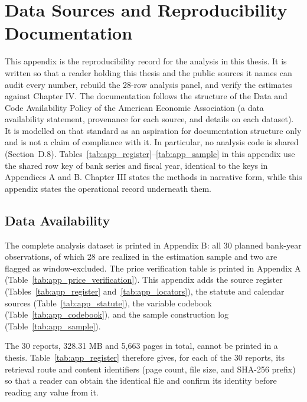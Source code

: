 \chapter{Data Sources and Reproducibility Documentation}
\label{app:reproducibility}

This appendix is the reproducibility record for the analysis in this thesis. It is written so that a reader holding this thesis and the public sources it names can audit every number, rebuild the 28-row analysis panel, and verify the estimates against Chapter IV. The documentation follows the structure of the Data and Code Availability Policy of the American Economic Association \citep{aea2026datacode} (a data availability statement, provenance for each source, and details on each dataset). It is modelled on that standard as an aspiration for documentation structure only and is not a claim of compliance with it. In particular, no analysis code is shared (Section~D.8). Tables~\ref{tab:app_register}--\ref{tab:app_sample} in this appendix use the shared row key of bank series and fiscal year, identical to the keys in Appendices A and B. Chapter III states the methods in narrative form, while this appendix states the operational record underneath them.

\section{Data Availability}

The complete analysis dataset is printed in Appendix B: all 30 planned bank-year observations, of which 28 are realized in the estimation sample and two are flagged as window-excluded. The price verification table is printed in Appendix A (Table~\ref{tab:app_price_verification}). This appendix adds the source register (Tables~\ref{tab:app_register} and~\ref{tab:app_locators}), the statute and calendar sources (Table~\ref{tab:app_statute}), the variable codebook (Table~\ref{tab:app_codebook}), and the sample construction log (Table~\ref{tab:app_sample}).

The 30 reports, 328.31 MB and 5,663 pages in total, cannot be printed in a thesis. Table~\ref{tab:app_register} therefore gives, for each of the 30 reports, its retrieval route and content identifiers (page count, file size, and SHA-256 prefix) so that a reader can obtain the identical file and confirm its identity before reading any value from it.

